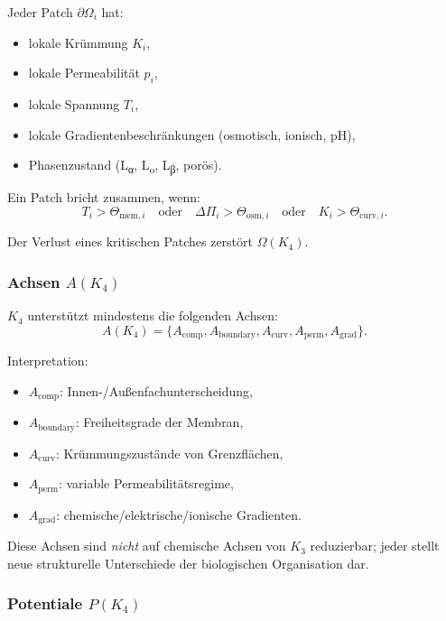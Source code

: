 Jeder Patch $\partial\Omega_i$ hat:
\begin{itemize}
    \item lokale Krümmung $K_i$,
    \item lokale Permeabilität $p_i$,
    \item lokale Spannung $T_i$,
    \item lokale Gradientenbeschränkungen (osmotisch, ionisch, pH),
    \item Phasenzustand (L\textsubscript{α}, L\textsubscript{o},
          L\textsubscript{β}, porös).
\end{itemize}

Ein Patch bricht zusammen, wenn:
\[
T_i > \Theta_{\mathrm{mem},i}
\quad \text{oder} \quad
\Delta \Pi_i > \Theta_{\mathrm{osm},i}
\quad \text{oder} \quad
K_i > \Theta_{\mathrm{curv},i}.
\]

Der Verlust eines kritischen Patches zerstört $\Omega(K_4)$.

\subsubsection{Achsen \texorpdfstring{$A(K_4)$}{A(K_4)}}

$K_4$ unterstützt mindestens die folgenden Achsen:
\[
A(K_4) = \{ A_{\mathrm{comp}}, A_{\mathrm{boundary}},
           A_{\mathrm{curv}}, A_{\mathrm{perm}}, A_{\mathrm{grad}}\}.
\]

Interpretation:
\begin{itemize}
    \item $A_{\mathrm{comp}}$: Innen-/Außenfachunterscheidung,
    \item $A_{\mathrm{boundary}}$: Freiheitsgrade der Membran,
    \item $A_{\mathrm{curv}}$: Krümmungszustände von Grenzflächen,
    \item $A_{\mathrm{perm}}$: variable Permeabilitätsregime,
    \item $A_{\mathrm{grad}}$: chemische/elektrische/ionische Gradienten.
\end{itemize}

Diese Achsen sind \emph{nicht} auf chemische Achsen von $K_3$ reduzierbar; jeder
stellt neue strukturelle Unterschiede der biologischen Organisation dar.

\subsubsection{Potentiale \texorpdfstring{$P(K_4)$}{P(K_4)}}


